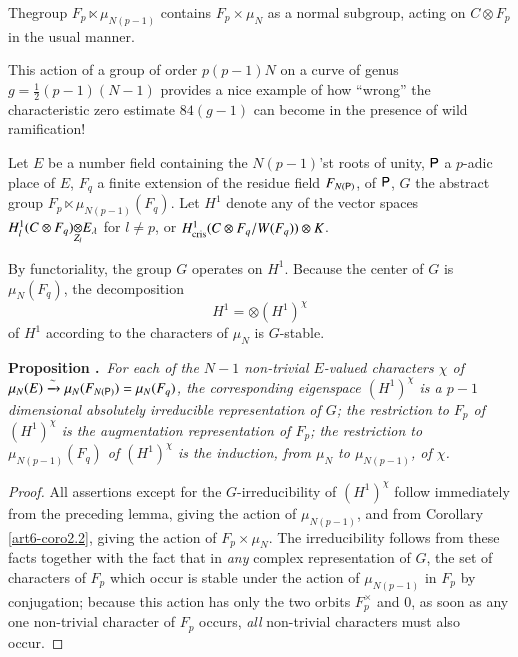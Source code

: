 The\pageoriginale group $F_{p}\ltimes \mu_{N(p-1)}$ contains $F_{p}\times \mu_{N}$ as a normal subgroup, acting on $C\otimes F_{p}$ in the usual manner.

\begin{remark*}
This action of a group of order $p(p-1)N$ on a curve of genus $g=\frac{1}{2}(p-1)(N-1)$ provides a nice example of how ``wrong'' the characteristic zero estimate $84(g-1)$ can become in the presence of wild ramification!
\end{remark*}

Let $E$ be a number field containing the $N(p-1)$'st roots of unity, $\mathsf{P}$ a $p$-adic place of $E$, $F_{q}$ a finite extension of the residue field $F_{N(\mathsf{P})}$, of $\mathsf{P}$, $G$ the abstract group $F_{p}\ltimes \mu_{N(p-1)}(F_{q})$. Let $H^{1}$ denote any of the vector spaces $\foprod{H^{1}_{l}(C\otimes F_{q})}{E_{\lambda}}{Z_{l}}$ for $l\neq p$, or $H^{1}_{\operatorname{cris}}(C\otimes F_{q}/W(F_{q}))\otimes K$. 

By functoriality, the group $G$ operates on $H^{1}$. Because the center of $G$ is $\mu_{N}(F_{q})$, the decomposition
$$
H^{1}=\otimes (H^{1})^{\chi}
$$
of $H^{1}$ according to the characters of $\mu_{N}$ is $G$-stable.

\vfill\eject

\medskip
\noindent
{\bf Proposition .\label{art6-prop7.2}}~{\em For each of the $N-1$ non-trivial $E$-valued characters $\chi$ of $\mu_{N}(E)\xrightarrow{\sim}\mu_{N}(F_{N(\mathsf{P})})=\mu_{N}(F_{q})$, the corresponding eigenspace $(H^{1})^{\chi}$ is a $p-1$ dimensional absolutely irreducible representation of $G$; the restriction to $F_{p}$ of $(H^{1})^{\chi}$ is the augmentation representation of $F_{p}$; the restriction to $\mu_{N(p-1)}(F_{q})$ of $(H^{1})^{\chi}$ is the induction, from $\mu_{N}$ to $\mu_{N(p-1)}$, of $\chi$.}

\begin{proof}
All assertions except for the $G$-irreducibility of $(H^{1})^{\chi}$ follow immediately from the preceding lemma, giving the action of $\mu_{N(p-1)}$, and from Corollary \eqref{art6-coro2.2}, giving the action of $F_{p}\times \mu_{N}$. The irreducibility follows from these facts together with the fact that in {\em any} complex representation of $G$, the set of characters of $F_{p}$ which occur is stable under the action of $\mu_{N(p-1)}$ in $F_{p}$ by conjugation; because this action has only the two orbits $F^{\times}_{p}$ and $0$, as soon as any one non-trivial character of $F_{p}$ occurs, {\em all} non-trivial characters must also occur.
\end{proof}

